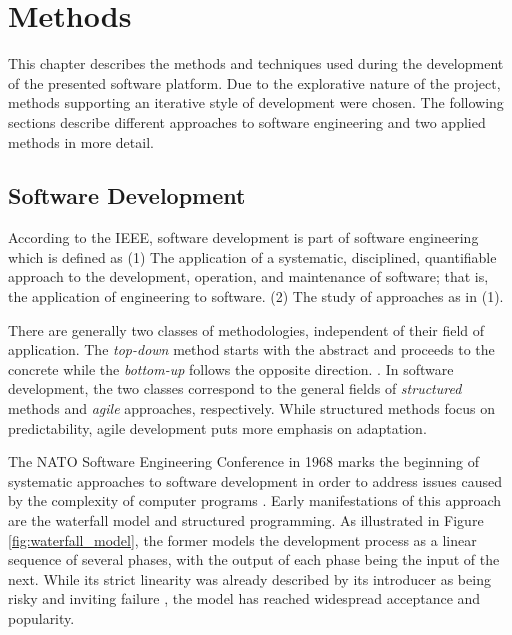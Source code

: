 
\graphicspath{{figures/methods/}}

\chapter{Methods}

This chapter describes the methods and techniques used during the development of the presented software platform. Due to the explorative nature of the project, methods supporting an iterative style of development were chosen. The following sections describe different approaches to software engineering and two applied methods in more detail.

\section{Software Development}

According to the IEEE, software development is part of software engineering which is defined as (1) The application of a systematic, disciplined, quantifiable approach to the development, operation, and maintenance of software; that is, the application of engineering to software. (2) The study of approaches as in (1). \cite{IeeeGlossary}

There are generally two classes of methodologies, independent of their field of application. The \textit{top-down} method starts with the abstract and proceeds to the concrete while the \textit{bottom-up} follows the opposite direction. \cite{Balzert}. In software development, the two classes correspond to the general fields of \textit{structured} methods and \textit{agile} approaches, respectively. While structured methods focus on predictability, agile development puts more emphasis on adaptation.

The NATO Software Engineering Conference in 1968 \cite{NatoConference} marks the beginning of systematic approaches to software development in order to address issues caused by the complexity of computer programs \cite{HumbleProgrammer}. Early manifestations of this approach are the waterfall model and structured programming. As illustrated in Figure \ref{fig:waterfall_model}, the former models the development process as a linear sequence of several phases, with the output of each phase being the input of the next. While its strict linearity was already described by its introducer as being risky and inviting failure \cite{ManagingLargeSystems}, the model has reached widespread acceptance and popularity.

